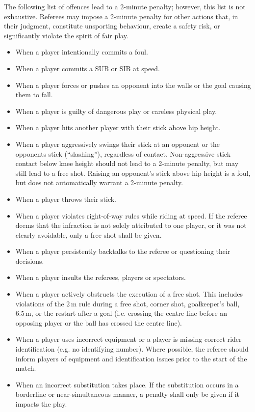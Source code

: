 The following list of offences lead to a 2-minute penalty; however, this list is not exhaustive.
Referees may impose a 2-minute penalty for other actions that, in their judgment, constitute unsporting behaviour, create a safety risk, or significantly violate the spirit of fair play.
\begin{itemize}
\item When a player intentionally commits a foul.
\item When a player commits a SUB or SIB at speed.
\item When a player forces or pushes an opponent into the walls or the goal causing them to fall.
\item When a player is guilty of dangerous play or careless physical play.
\item When a player hits another player with their stick above hip height.
\item When a player aggressively swings their stick at an opponent or the opponents stick (“slashing”), regardless of contact.
Non-aggressive stick contact below knee height should not lead to a 2-minute penalty, but may still lead to a free shot.
Raising an opponent’s stick above hip height is a foul, but does not automatically warrant a 2-minute penalty.
\item When a player throws their stick.
\item When a player violates right-of-way rules while riding at speed.
If the referee deems that the infraction is not solely attributed to one player, or it was not clearly avoidable, only a free shot shall be given.
\item When a player persistently backtalks to the referee or questioning their decisions.
\item When a player insults the referees, players or spectators.
\item When a player actively obstructs the execution of a free shot.
This includes violations of the 2\,m rule during a free shot, corner shot, goalkeeper's ball, 6.5\,m, or the restart after a goal (i.e. crossing the centre line before an opposing player or the ball has crossed the centre line).
\item When a player uses incorrect equipment or a player is missing correct rider identification (e.g. no identifying number).
Where possible, the referee should inform players of equipment and identification issues prior to the start of the match.
\item When an incorrect substitution takes place.
If the substitution occurs in a borderline or near-simultaneous manner, a penalty shall only be given if it impacts the play.

\end{itemize}
